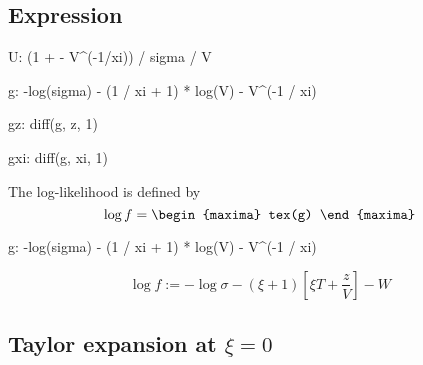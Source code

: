 \subsection{Expression}

\begin{maxima}
  U: (1 + \xi - V^(-1/xi)) / sigma / V
\end{maxima}

\begin{maxima}
  g: -log(sigma) - (1 / xi + 1) * log(V) - V^(-1 / xi)
\end{maxima}
%
\begin{maxima}
  gz: diff(g, z, 1)
\end{maxima}%
\begin{maxima}
  gxi: diff(g, xi, 1)
\end{maxima}%

The log-likelihood is defined by
\[
\log f = 
\begin{maxima}
  tex(g)
\end{maxima}
\]

\begin{maxima}
  g: -log(sigma) - (1 / xi + 1) * log(V) - V^(-1 / xi)
\end{maxima}

{\color{red}
  \begin{equation}
    \log f  := - \log \sigma - (\xi + 1) \left[\xi T + \frac{z}{V}\right] - W
  \end{equation}
}




\subsection{Taylor expansion at $\xi = 0$}

